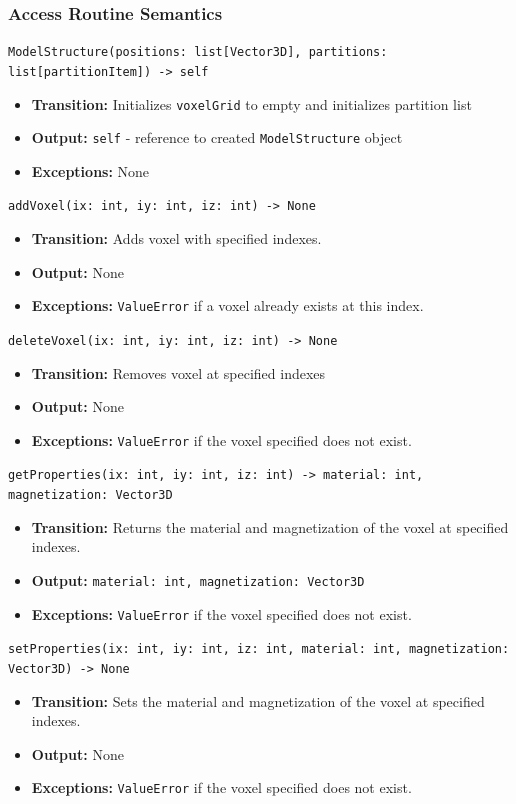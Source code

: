 \documentclass[12pt, titlepage]{article}
\begin{document}
\subsubsection{Access Routine Semantics}
\texttt{ModelStructure(positions: list[Vector3D], partitions: list[partitionItem]) -> self}
\begin{itemize}
  \item \textbf{Transition:} Initializes \texttt{voxelGrid} to empty and initializes partition list
  \item \textbf{Output:} \texttt{self} - reference to created \texttt{ModelStructure} object
  \item \textbf{Exceptions:} None
\end{itemize}
\texttt{addVoxel(ix: int, iy: int, iz: int) -> None}
\begin{itemize}
  \item \textbf{Transition:} Adds voxel with specified indexes.
  \item \textbf{Output:} None
  \item \textbf{Exceptions:} \texttt{ValueError} if a voxel already exists at this index.
\end{itemize}
\texttt{deleteVoxel(ix: int, iy: int, iz: int) -> None}
\begin{itemize}
  \item \textbf{Transition:} Removes voxel at specified indexes
  \item \textbf{Output:} None
  \item \textbf{Exceptions:} \texttt{ValueError} if the voxel specified does not exist.
\end{itemize}
\texttt{getProperties(ix: int, iy: int, iz: int) -> material: int, magnetization: Vector3D}
\begin{itemize}
  \item \textbf{Transition:} Returns the material and magnetization of the voxel at specified indexes.
  \item \textbf{Output:} \texttt{material: int, magnetization: Vector3D}
  \item \textbf{Exceptions:} \texttt{ValueError} if the voxel specified does not exist.
\end{itemize}
\texttt{setProperties(ix: int, iy: int, iz: int, material: int, magnetization: Vector3D) -> None}
\begin{itemize}
  \item \textbf{Transition:} Sets the material and magnetization of the voxel at specified indexes.
  \item \textbf{Output:} None
  \item \textbf{Exceptions:} \texttt{ValueError} if the voxel specified does not exist.
\end{itemize}
\end{document}
